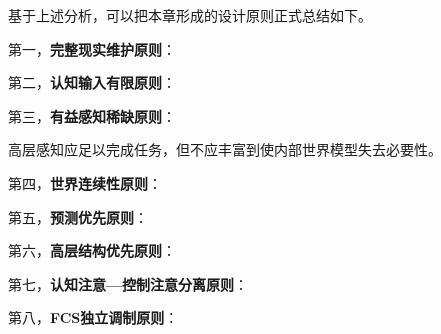 基于上述分析，可以把本章形成的设计原则正式总结如下。

第一，\textbf{完整现实维护原则}：

\begin{statementbox}
\centering
{}
\end{statementbox}

第二，\textbf{认知输入有限原则}：

\begin{statementbox}
\centering
{}
\end{statementbox}

第三，\textbf{有益感知稀缺原则}：

\begin{proposition*}
高层感知应足以完成任务，但不应丰富到使内部世界模型失去必要性。
\end{proposition*}

第四，\textbf{世界连续性原则}：

\begin{statementbox}
\centering
{}
\end{statementbox}

第五，\textbf{预测优先原则}：

\begin{statementbox}
\centering
{}
\end{statementbox}

第六，\textbf{高层结构优先原则}：

\begin{statementbox}
\centering
{}
\end{statementbox}

第七，\textbf{认知注意—控制注意分离原则}：

\begin{statementbox}
\centering
{}
\end{statementbox}

第八，\textbf{FCS独立调制原则}：

